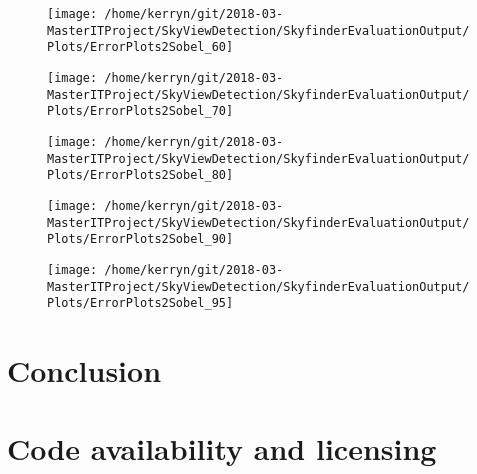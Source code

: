 \documentclass[final,3p,times,authoryear]{elsarticle}
\begin{document}
\begin{figure}
\centering
\texttt{[image: /home/kerryn/git/2018-03-MasterITProject/SkyViewDetection/SkyfinderEvaluationOutput/Plots/ErrorPlots2Sobel\_60]}
\caption{}
\label{fig:errorplots2sobel60}
\end{figure}
\begin{figure}
\centering
\texttt{[image: /home/kerryn/git/2018-03-MasterITProject/SkyViewDetection/SkyfinderEvaluationOutput/Plots/ErrorPlots2Sobel\_70]}
\caption{}
\label{fig:errorplots2sobel70}
\end{figure}
\begin{figure}
\centering
\texttt{[image: /home/kerryn/git/2018-03-MasterITProject/SkyViewDetection/SkyfinderEvaluationOutput/Plots/ErrorPlots2Sobel\_80]}
\caption{}
\label{fig:errorplots2sobel80}
\end{figure}
\begin{figure}
\centering
\texttt{[image: /home/kerryn/git/2018-03-MasterITProject/SkyViewDetection/SkyfinderEvaluationOutput/Plots/ErrorPlots2Sobel\_90]}
\caption{}
\label{fig:errorplots2sobel90}
\end{figure}
\begin{figure}
\centering
\texttt{[image: /home/kerryn/git/2018-03-MasterITProject/SkyViewDetection/SkyfinderEvaluationOutput/Plots/ErrorPlots2Sobel\_95]}
\caption{}
\label{fig:errorplots2sobel95}
\end{figure}


\section{Conclusion}\label{sec:conclusion}


\section{Code availability and licensing}\label{sec:available}

\end{document}
